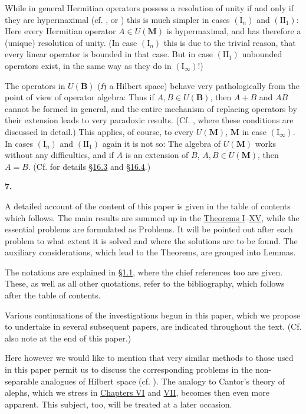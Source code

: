 \documentclass[12pt,b5paper,twoside]{article}
\newcommand{\Hspace}{\mathfrak H}
\newcommand{\M}{\mathbf M}
\newcommand{\B}{\mathbf B}
\newcommand{\IntroStart}[2]{%
  \par\medskip
  \phantomsection\label{intro:#1}%
  \addcontentsline{toc}{subsection}{#1. #2}%
  \noindent\textbf{#1.}\enspace
}
\newcommand{\secref}[1]{\hyperref[sec:#1]{\S#1}}
\begin{document}
While in general Hermitian operators possess a resolution of unity if and only
if they are hypermaximal (cf. \cite[p.~92]{ref16}, or
\cite[Theorem 9.3, p.~339]{ref15}) this is much simpler in cases
$(\mathrm I_n)$ and $(\mathrm{II}_1)$: Here every Hermitian operator
$A\in U(\M)$ is hypermaximal, and has therefore a (unique) resolution of unity.
(In case $(\mathrm I_n)$ this is due to the trivial reason, that every linear
operator is bounded in that case. But in case $(\mathrm{II}_1)$ unbounded
operators exist, in the same way as they do in $(\mathrm I_\infty)$!)

The operators in $U(\B)$ ($\Hspace$ a Hilbert space) behave very pathologically
from the point of view of operator algebra: Thus if $A,B\in U(\B)$, then $A+B$
and $AB$ cannot be formed in general, and the entire mechanism of replacing
operators by their extension leads to very paradoxic results.
(Cf. \cite[pp.~230--234]{ref17}, where these conditions are discussed in
detail.) This applies, of course, to every $U(\M)$, $\M$ in case
$(\mathrm I_\infty)$. In cases $(\mathrm I_n)$ and $(\mathrm{II}_1)$ again it is
not so: The algebra of $U(\M)$ works without any difficulties, and if $A$ is an
extension of $B$, $A,B\in U(\M)$, then $A=B$. (Cf. for details \secref{16.3}
and \secref{16.4}.)

\IntroStart{7}{Outline}
A detailed account of the content of this paper is given in the table of contents
which follows. The main results are summed up in the
\hyperref[thm:I]{Theorems I}--\hyperref[thm:XV]{XV}, while
the essential problems are formulated as Problems. It will be pointed out after
each problem to what extent it is solved and where the solutions are to be
found. The auxiliary considerations, which lead to the Theorems, are grouped
into Lemmas.

The notations are explained in \secref{1.1}, where the chief references too are
given. These, as well as all other quotations, refer to the bibliography, which
follows after the table of contents.

Various continuations of the investigations begun in this paper, which we
propose to undertake in several subsequent papers, are indicated throughout the
text. (Cf. also note at the end of this paper.)

Here however we would like to mention that very similar methods to those used
in this paper permit us to discuss the corresponding problems in the
non-separable analogues of Hilbert space (cf. \cite{ref11,ref13}). The analogy
to Cantor's theory of alephs, which we stress in
\hyperref[chap:6]{Chapters VI} and \hyperref[chap:7]{VII}, becomes
then even more apparent. This subject, too, will be treated at a later occasion.
\end{document}
